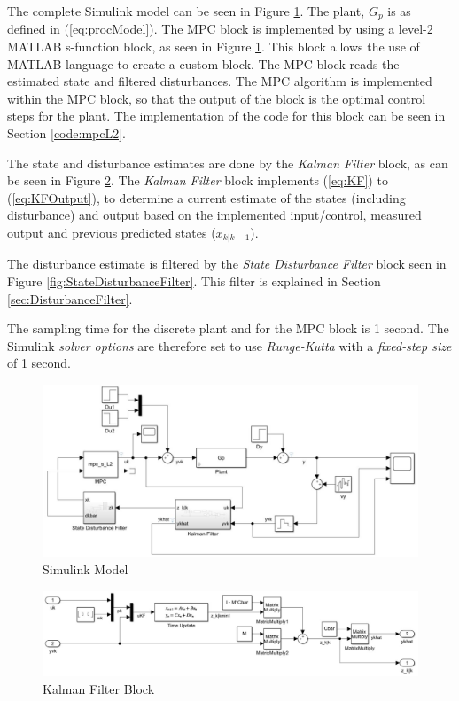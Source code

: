 \documentclass[12pt]{article}
\begin{document}
The complete Simulink model can be seen in Figure \ref{fig:FullModel}. The plant, $G_p$ is as defined in (\ref{eq:procModel}). The MPC block is implemented by using a level-2 MATLAB s-function block, as seen in Figure \ref{fig:FullModel}. This block allows the use of MATLAB language to create a custom block. The MPC block reads the estimated state and filtered disturbances. The MPC algorithm is implemented within the MPC block, so that the output of the block is the optimal control steps for the plant. The implementation of the code for this block can be seen in Section \ref{code:mpcL2}.

The state and disturbance estimates are done by the \textit{Kalman Filter} block, as can be seen in Figure \ref{fig:KalmanFilter}. The \textit{Kalman Filter} block implements (\ref{eq:KF}) to (\ref{eq:KFOutput}), to determine a current estimate of the states (including disturbance) and output based on the implemented input/control, measured output and previous predicted states ($x_{k|k-1}$).

The disturbance estimate is filtered by the \textit{State Disturbance Filter} block seen in Figure \ref{fig:StateDisturbanceFilter}. This filter is explained in Section \ref{sec:DisturbanceFilter}.

The sampling time for the discrete plant and for the MPC block is 1 second. The Simulink \textit{solver options} are therefore set to use \textit{Runge-Kutta} with a \textit{fixed-step size} of 1 second.

\begin{figure}[H]
	\includegraphics[width=17cm]{FullModel.jpg}
	\centering
	\caption{Simulink Model}
	\label{fig:FullModel}
\end{figure}

\begin{figure}[H]
	\includegraphics[width=17cm]{KalmanFilter.jpg}
	\centering
	\caption{Kalman Filter Block}
	\label{fig:KalmanFilter}
\end{figure}
\end{document}
